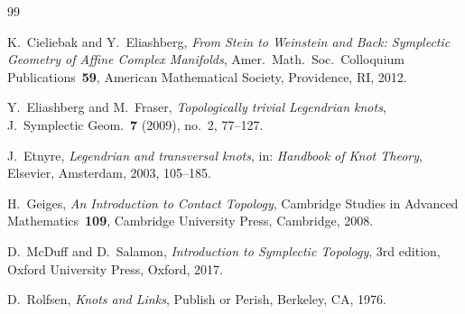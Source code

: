 \documentclass[12pt]{article}
\theoremstyle{definition}
\begin{document}
\begin{thebibliography}{99}

  K.~Cieliebak and Y.~Eliashberg,
  \emph{From Stein to Weinstein and Back: Symplectic Geometry of Affine
  Complex Manifolds},
  Amer.\ Math.\ Soc.\ Colloquium Publications~\textbf{59},
  American Mathematical Society, Providence, RI, 2012.

  Y.~Eliashberg and M.~Fraser,
  \emph{Topologically trivial Legendrian knots},
  J.\ Symplectic Geom.\ \textbf{7} (2009), no.~2, 77--127.

  J.~Etnyre,
  \emph{Legendrian and transversal knots},
  in: \emph{Handbook of Knot Theory},
  Elsevier, Amsterdam, 2003, 105--185.

  H.~Geiges,
  \emph{An Introduction to Contact Topology},
  Cambridge Studies in Advanced Mathematics~\textbf{109},
  Cambridge University Press, Cambridge, 2008.

  D.~McDuff and D.~Salamon,
  \emph{Introduction to Symplectic Topology},
  3rd edition, Oxford University Press, Oxford, 2017.

  D.~Rolfsen,
  \emph{Knots and Links},
  Publish or Perish, Berkeley, CA, 1976.

\end{thebibliography}
\end{document}
